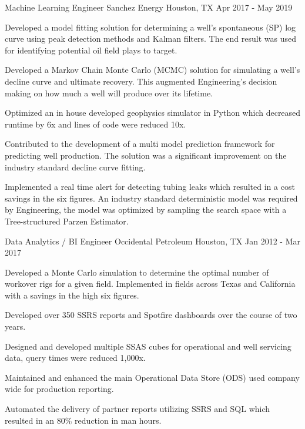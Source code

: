 \begin{cventries}
\cventry
{Machine Learning Engineer} %
{Sanchez Energy} %
{Houston, TX} %
{Apr 2017 - May 2019} %
{ %
\begin{cvitems}
\item {Developed a model fitting solution for determining a well's spontaneous (SP) log curve using peak detection methods and Kalman filters. The end result was used for identifying potential oil field plays to target.}
\item {Developed a Markov Chain Monte Carlo (MCMC) solution for simulating a well's decline curve and ultimate recovery. This augmented Engineering's decision making on how much a well will produce over its lifetime.}
\item {Optimized an in house developed geophysics simulator in Python which decreased runtime by 6x and lines of code were reduced 10x.}
\item {Contributed to the development of a multi model prediction framework for predicting well production. The solution was a significant improvement on the industry standard decline curve fitting.}
\item {Implemented a real time alert for detecting tubing leaks which resulted in a cost savings in the six figures. An industry standard deterministic model was required by Engineering, the model was optimized by sampling the search space with a Tree-structured Parzen Estimator.}
\end{cvitems}
}


\cventry
{Data Analytics / BI Engineer} %
{Occidental Petroleum} %
{Houston, TX} %
{Jan 2012 - Mar 2017} %
{
\begin{cvitems}
\item {Developed a Monte Carlo simulation to determine the optimal number of workover rigs for a given field. Implemented in fields across Texas and California with a savings in the high six figures.}
\item {Developed over 350 SSRS reports and Spotfire dashboards over the course of two years.}
\item {Designed and developed multiple SSAS cubes for operational and well servicing data, query times were reduced 1,000x.}
\item {Maintained and enhanced the main Operational Data Store (ODS) used company wide for production reporting.}
\item {Automated the delivery of partner reports utilizing SSRS and SQL which resulted in an 80\% reduction in man hours.}
\end{cvitems}
}

\end{cventries}